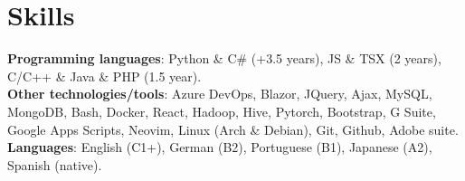 \documentclass[letterpaper,11pt]{article}
\begin{document}
%
\section{Skills}
 \begin{itemize}[leftmargin=0.15in, label={}]
    \small{\item{
     \textbf{Programming languages}{: Python \& C\# (+3.5 years), JS \& TSX (2 years), C/C++ \& Java \& PHP (1.5 year).} \\
     \textbf{Other technologies/tools}{: Azure DevOps, Blazor, JQuery, Ajax, MySQL, MongoDB, Bash, Docker, React, Hadoop, Hive,
     Pytorch, Bootstrap, G Suite, Google Apps Scripts, Neovim, Linux (Arch \& Debian), Git, Github, Adobe suite.} \\
     \textbf{Languages}{: English (C1+), German (B2), Portuguese (B1), Japanese (A2), Spanish (native).}
    }}
 \end{itemize}


\end{document}
